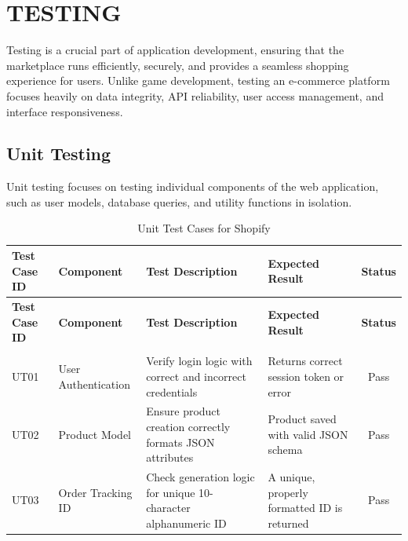 \chapter{TESTING}
Testing is a crucial part of application development, ensuring that the marketplace runs efficiently, securely, and provides a seamless shopping experience for users. Unlike game development, testing an e-commerce platform focuses heavily on data integrity, API reliability, user access management, and interface responsiveness.

\section{Unit Testing}
Unit testing focuses on testing individual components of the web application, such as user models, database queries, and utility functions in isolation.
\renewcommand{\arraystretch}{1.3}
\begin{longtable}{|p{1.5cm}|p{2.5cm}|p{4cm}|p{4cm}|c|}
    \hline
    \textbf{Test Case ID} & \textbf{Component} & \textbf{Test Description} & \textbf{Expected Result} & \textbf{Status} \\
    \hline
    \endfirsthead
    \hline
    \textbf{Test Case ID} & \textbf{Component} & \textbf{Test Description} & \textbf{Expected Result} & \textbf{Status} \\
    \hline
    \endhead
    \hline
    \endfoot
    \hline
    \caption{Unit Test Cases for Shopify} \label{tab:unit_tests} \\
    \endlastfoot

    UT01 & User Authentication & \raggedright Verify login logic with correct and incorrect credentials & \raggedright Returns correct session token or error & Pass \\
    \hline
    UT02 & Product Model & \raggedright Ensure product creation correctly formats JSON attributes & \raggedright Product saved with valid JSON schema & Pass \\
    \hline
    UT03 & Order Tracking ID & \raggedright Check generation logic for unique 10-character alphanumeric ID & \raggedright A unique, properly formatted ID is returned & Pass \\
    \end{longtable}

\newpage
